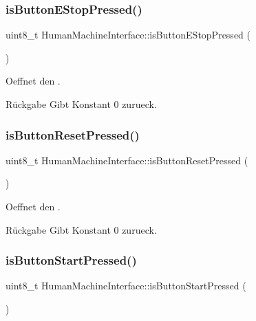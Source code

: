 \subsubsection{\texorpdfstring{is\+Button\+E\+Stop\+Pressed()}{isButtonEStopPressed()}}
{\footnotesize\ttfamily uint8\+\_\+t Human\+Machine\+Interface\+::is\+Button\+E\+Stop\+Pressed (\begin{DoxyParamCaption}{ }\end{DoxyParamCaption})}

Oeffnet den .

\begin{DoxyReturn}{Rückgabe}
Gibt Konstant 0 zurueck. 
\end{DoxyReturn}
\hypertarget{class_human_machine_interface_ab78f8bd8db3e0b150699416d8081ee98}{}\label{class_human_machine_interface_ab78f8bd8db3e0b150699416d8081ee98} 
\subsubsection{\texorpdfstring{is\+Button\+Reset\+Pressed()}{isButtonResetPressed()}}
{\footnotesize\ttfamily uint8\+\_\+t Human\+Machine\+Interface\+::is\+Button\+Reset\+Pressed (\begin{DoxyParamCaption}{ }\end{DoxyParamCaption})}

Oeffnet den .

\begin{DoxyReturn}{Rückgabe}
Gibt Konstant 0 zurueck. 
\end{DoxyReturn}
\hypertarget{class_human_machine_interface_a4926796f1c1411f975e2da96c68079dd}{}\label{class_human_machine_interface_a4926796f1c1411f975e2da96c68079dd} 
\subsubsection{\texorpdfstring{is\+Button\+Start\+Pressed()}{isButtonStartPressed()}}
{\footnotesize\ttfamily uint8\+\_\+t Human\+Machine\+Interface\+::is\+Button\+Start\+Pressed (\begin{DoxyParamCaption}{ }\end{DoxyParamCaption})}

